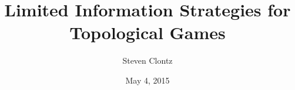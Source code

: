 \documentclass[12pt]{report}
\title{Limited Information Strategies for Topological Games}
\author{Steven Clontz}
\date{May 4, 2015} %
\theoremstyle{definition}
\begin{document}
\begin{romanpages}      %

\TitlePage




\tableofcontents
\listoffigures

\printnomenclature[0.5in] %
\end{romanpages}        %


\normalem       %

% 










% 
\end{document}
